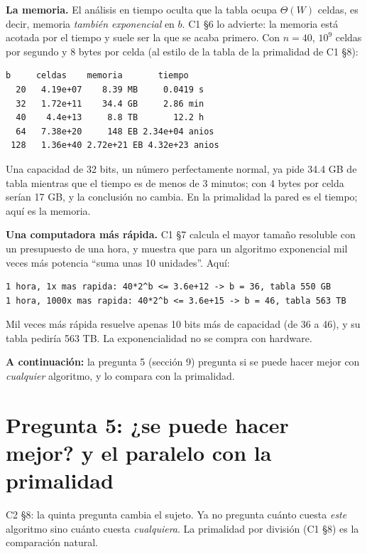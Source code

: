 \documentclass[11pt]{article}
\begin{document}
\textbf{La memoria.} El análisis en tiempo oculta que la tabla ocupa $\Theta(W)$ celdas, es decir, memoria
\emph{también exponencial} en $b$. C1 §6 lo advierte: la memoria está acotada por el tiempo y suele ser la que
se acaba primero. Con $n=40$, $10^9$ celdas por segundo y 8 bytes por celda (al estilo de la tabla de la
primalidad de C1 §8):
\begin{lstlisting}[style=salida,basicstyle=\ttfamily\footnotesize\color{black},columns=fixed]
   b     celdas    memoria       tiempo
  20   4.19e+07    8.39 MB     0.0419 s
  32   1.72e+11    34.4 GB     2.86 min
  40    4.4e+13     8.8 TB       12.2 h
  64   7.38e+20     148 EB 2.34e+04 anios
 128   1.36e+40 2.72e+21 EB 4.32e+23 anios
\end{lstlisting}
Una capacidad de 32 bits, un número perfectamente normal, ya pide 34.4 GB de tabla mientras que el tiempo es
de menos de 3 minutos; con 4 bytes por celda serían 17 GB, y la conclusión no cambia. En la primalidad la pared
es el tiempo; aquí es la memoria.

\textbf{Una computadora más rápida.} C1 §7 calcula el mayor tamaño resoluble con un presupuesto de una hora, y
muestra que para un algoritmo exponencial mil veces más potencia ``suma unas 10 unidades''. Aquí:
\begin{lstlisting}[style=salida,basicstyle=\ttfamily\footnotesize\color{black},columns=fixed]
1 hora, 1x mas rapida: 40*2^b <= 3.6e+12 -> b = 36, tabla 550 GB
1 hora, 1000x mas rapida: 40*2^b <= 3.6e+15 -> b = 46, tabla 563 TB
\end{lstlisting}
Mil veces más rápida resuelve apenas 10 bits más de capacidad (de 36 a 46), y su tabla pediría 563 TB. La
exponencialidad no se compra con hardware.

\textbf{A continuación:} la pregunta 5 (sección 9) pregunta si se puede hacer mejor con \emph{cualquier} algoritmo, y lo compara con la primalidad.

\section{Pregunta 5: ¿se puede hacer mejor? y el paralelo con la primalidad}

C2 §8: la quinta pregunta cambia el sujeto. Ya no pregunta cuánto cuesta \emph{este} algoritmo sino cuánto
cuesta \emph{cualquiera}. La primalidad por división (C1 §8) es la comparación natural.
\end{document}
